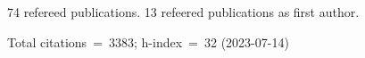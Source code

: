 74 refereed publications. 13 refeered publications as first author.

Total citations~=~3383; h-index~=~32 (2023-07-14)